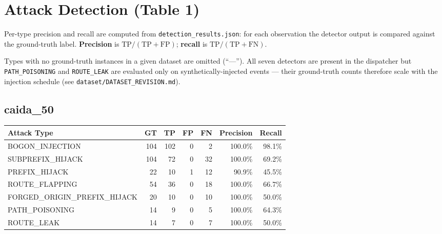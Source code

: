 \documentclass[10pt,a4paper]{article}
\begin{document}
\newpage
\section{Attack Detection (Table 1)}
\label{sec:detection}

Per-type precision and recall are computed from
\texttt{detection\_results.json}: for each observation the detector
output is compared against the ground-truth label. \textbf{Precision} is
$\text{TP}/(\text{TP}+\text{FP})$; \textbf{recall} is
$\text{TP}/(\text{TP}+\text{FN})$.

Types with no ground-truth instances in a given dataset are omitted
(``—''). All seven detectors are present in the dispatcher but
\texttt{PATH\_POISONING} and \texttt{ROUTE\_LEAK} are evaluated only on
synthetically-injected events --- their ground-truth counts therefore
scale with the injection schedule (see
\texttt{dataset/DATASET\_REVISION.md}).

\subsection{caida\_50}
\begin{table}[h]
\centering
\small
\begin{tabular}{lrrrrrr}
\toprule
Attack Type & GT & TP & FP & FN & Precision & Recall \\
\midrule

BOGON\_INJECTION & 104 & 102 & 0 & 2 & 100.0\% & 98.1\% \\
SUBPREFIX\_HIJACK & 104 & 72 & 0 & 32 & 100.0\% & 69.2\% \\
PREFIX\_HIJACK & 22 & 10 & 1 & 12 & 90.9\% & 45.5\% \\
ROUTE\_FLAPPING & 54 & 36 & 0 & 18 & 100.0\% & 66.7\% \\
FORGED\_ORIGIN\_PREFIX\_HIJACK & 20 & 10 & 0 & 10 & 100.0\% & 50.0\% \\
PATH\_POISONING & 14 & 9 & 0 & 5 & 100.0\% & 64.3\% \\
ROUTE\_LEAK & 14 & 7 & 0 & 7 & 100.0\% & 50.0\% \\
\bottomrule
\end{tabular}
\end{table}
\end{document}
